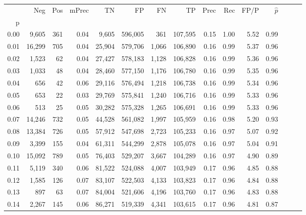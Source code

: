 \begin{tabular}{rrrrrrrrrrrrrrr}
\toprule
{} &     Neg &    Pos & mPrec &       TN &       FP &       FN &       TP &  Prec &   Rec &  FP/P & $\hat{p}$ \\
p    &         &        &       &          &          &          &          &       &       &       &           \\
\midrule
0.00 &   9,605 &    361 &  0.04 &    9,605 &  596,005 &      361 &  107,595 &  0.15 &  1.00 &  5.52 &      0.99 \\
0.01 &  16,299 &    705 &  0.04 &   25,904 &  579,706 &    1,066 &  106,890 &  0.16 &  0.99 &  5.37 &      0.96 \\
0.02 &   1,523 &     62 &  0.04 &   27,427 &  578,183 &    1,128 &  106,828 &  0.16 &  0.99 &  5.36 &      0.96 \\
0.03 &   1,033 &     48 &  0.04 &   28,460 &  577,150 &    1,176 &  106,780 &  0.16 &  0.99 &  5.35 &      0.96 \\
0.04 &     656 &     42 &  0.06 &   29,116 &  576,494 &    1,218 &  106,738 &  0.16 &  0.99 &  5.34 &      0.96 \\
0.05 &     653 &     22 &  0.03 &   29,769 &  575,841 &    1,240 &  106,716 &  0.16 &  0.99 &  5.33 &      0.96 \\
0.06 &     513 &     25 &  0.05 &   30,282 &  575,328 &    1,265 &  106,691 &  0.16 &  0.99 &  5.33 &      0.96 \\
0.07 &  14,246 &    732 &  0.05 &   44,528 &  561,082 &    1,997 &  105,959 &  0.16 &  0.98 &  5.20 &      0.93 \\
0.08 &  13,384 &    726 &  0.05 &   57,912 &  547,698 &    2,723 &  105,233 &  0.16 &  0.97 &  5.07 &      0.92 \\
0.09 &   3,399 &    155 &  0.04 &   61,311 &  544,299 &    2,878 &  105,078 &  0.16 &  0.97 &  5.04 &      0.91 \\
0.10 &  15,092 &    789 &  0.05 &   76,403 &  529,207 &    3,667 &  104,289 &  0.16 &  0.97 &  4.90 &      0.89 \\
0.11 &   5,119 &    340 &  0.06 &   81,522 &  524,088 &    4,007 &  103,949 &  0.17 &  0.96 &  4.85 &      0.88 \\
0.12 &   1,585 &    126 &  0.07 &   83,107 &  522,503 &    4,133 &  103,823 &  0.17 &  0.96 &  4.84 &      0.88 \\
0.13 &     897 &     63 &  0.07 &   84,004 &  521,606 &    4,196 &  103,760 &  0.17 &  0.96 &  4.83 &      0.88 \\
0.14 &   2,267 &    145 &  0.06 &   86,271 &  519,339 &    4,341 &  103,615 &  0.17 &  0.96 &  4.81 &      0.87 \\

\end{tabular}

